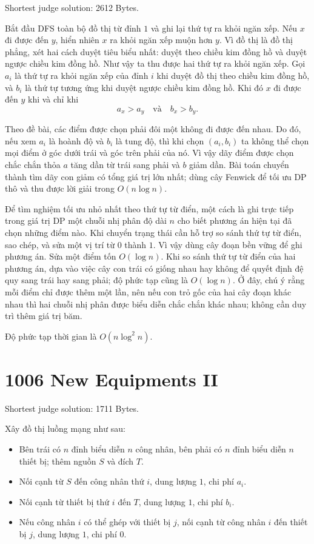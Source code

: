 \documentclass[11pt]{article}
\begin{document}
Shortest judge solution: 2612 Bytes.

Bắt đầu DFS toàn bộ đồ thị từ đỉnh $1$ và ghi lại thứ tự ra khỏi ngăn xếp.
Nếu $x$ đi được đến $y$, hiển nhiên $x$ ra khỏi ngăn xếp muộn hơn $y$. Vì đồ
thị là đồ thị phẳng, xét hai cách duyệt tiêu biểu nhất: duyệt theo chiều kim
đồng hồ và duyệt ngược chiều kim đồng hồ. Như vậy ta thu được hai thứ tự ra
khỏi ngăn xếp. Gọi $a_i$ là thứ tự ra khỏi ngăn xếp của đỉnh $i$ khi duyệt
đồ thị theo chiều kim đồng hồ, và $b_i$ là thứ tự tương ứng khi duyệt ngược
chiều kim đồng hồ. Khi đó $x$ đi được đến $y$ khi và chỉ khi
\[
  a_x>a_y \quad\text{và}\quad b_x>b_y.
\]

Theo đề bài, các điểm được chọn phải đôi một không đi được đến nhau. Do đó,
nếu xem $a_i$ là hoành độ và $b_i$ là tung độ, thì khi chọn $(a_i,b_i)$ ta
không thể chọn mọi điểm ở góc dưới trái và góc trên phải của nó. Vì vậy dãy
điểm được chọn chắc chắn thỏa $a$ tăng dần từ trái sang phải và $b$ giảm
dần. Bài toán chuyển thành tìm dãy con giảm có tổng giá trị lớn nhất; dùng
cây Fenwick để tối ưu DP thô và thu được lời giải trong $O(n\log n)$.

Để tìm nghiệm tối ưu nhỏ nhất theo thứ tự từ điển, một cách là ghi trực tiếp
trong giá trị DP một chuỗi nhị phân độ dài $n$ cho biết phương án hiện tại
đã chọn những điểm nào. Khi chuyển trạng thái cần hỗ trợ so sánh thứ tự từ
điển, sao chép, và sửa một vị trí từ $0$ thành $1$. Vì vậy dùng cây đoạn bền
vững để ghi phương án. Sửa một điểm tốn $O(\log n)$. Khi so sánh thứ tự từ
điển của hai phương án, dựa vào việc cây con trái có giống nhau hay không để
quyết định đệ quy sang trái hay sang phải; độ phức tạp cũng là $O(\log n)$.
Ở đây, chú ý rằng mỗi điểm chỉ được thêm một lần, nên nếu con trỏ gốc của hai
cây đoạn khác nhau thì hai chuỗi nhị phân được biểu diễn chắc chắn khác nhau;
không cần duy trì thêm giá trị băm.

Độ phức tạp thời gian là $O(n\log^2 n)$.

\section{1006 New Equipments II}

Shortest judge solution: 1711 Bytes.

Xây đồ thị luồng mạng như sau:

\begin{itemize}
  \item Bên trái có $n$ đỉnh biểu diễn $n$ công nhân, bên phải có $n$ đỉnh
  biểu diễn $n$ thiết bị; thêm nguồn $S$ và đích $T$.
  \item Nối cạnh từ $S$ đến công nhân thứ $i$, dung lượng $1$, chi phí $a_i$.
  \item Nối cạnh từ thiết bị thứ $i$ đến $T$, dung lượng $1$, chi phí $b_i$.
  \item Nếu công nhân $i$ có thể ghép với thiết bị $j$, nối cạnh từ công nhân
  $i$ đến thiết bị $j$, dung lượng $1$, chi phí $0$.
\end{itemize}
\end{document}

